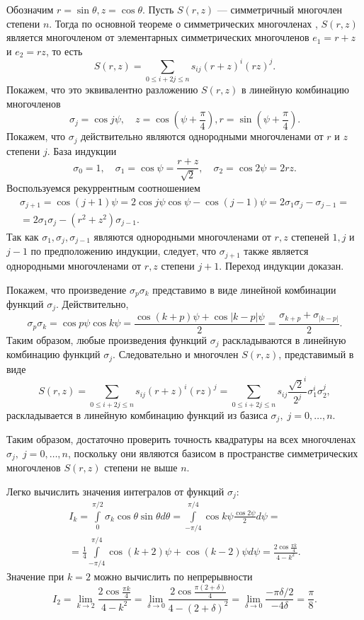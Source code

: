 Обозначим $r = \sin \theta, z = \cos \theta$. Пусть $S(r, z)$ --- симметричный многочлен степени $n$. Тогда по основной теореме о симметрических многочленах \cite{kurosh1968}, $S(r,z)$ является многочленом от элементарных симметрических многочленов $e_1 = r + z$ и $e_2 = r z$, то есть
\[
S(r, z) = \sum_{0 \leq i + 2j \leq n} s_{ij} (r + z)^i (r z)^{j}.
\]
Покажем, что это эквивалентно разложению $S(r, z)$ в линейную комбинацию многочленов
\[
\sigma_j = \cos j \psi, \quad z = \cos \left(\psi + \frac{\pi}{4}\right), r = \sin \left(\psi + \frac{\pi}{4}\right).
\]
Покажем, что $\sigma_j$ действительно являются однородными многочленами от $r$ и $z$ степени $j$. База индукции
\[
\sigma_0 = 1, \quad \sigma_1 = \cos \psi = \frac{r + z}{\sqrt{2}}, \quad \sigma_2 = \cos 2 \psi = 2 r z.
\]
Воспользуемся рекуррентным соотношением
\begin{multline*}
\sigma_{j+1} = \cos (j+1)\psi = 2\cos j\psi \cos \psi - \cos(j-1) \psi = 2 \sigma_1 \sigma_j - \sigma_{j-1} = \\ =
2 \sigma_1 \sigma_j - (r^2 + z^2) \sigma_{j-1}.
\end{multline*}
Так как $\sigma_1, \sigma_j, \sigma_{j-1}$ являются однородными многочленами от $r,z$ степеней $1, j$ и $j-1$ по предположению индукции, следует, что 
$\sigma_{j+1}$ также является однородными многочленами от $r,z$ степени $j + 1$. Переход индукции доказан.

Покажем, что произведение $\sigma_p \sigma_k$ представимо в виде линейной комбинации функций $\sigma_j$. Действительно,
\[
\sigma_p \sigma_k = \cos p \psi \cos k \psi = \frac{\cos (k + p) \psi + \cos |k - p|\psi}{2} = \frac{\sigma_{k+p} + \sigma_{|k-p|}}{2}.
\]
Таким образом, любые произведения функций $\sigma_j$ раскладываются в линейную комбинацию функций $\sigma_j$. Следовательно и многочлен $S(r, z)$, представимый в виде
\[
S(r, z) = \sum_{0 \leq i + 2j \leq n} s_{ij} (r + z)^i (r z)^{j} =  \sum_{0 \leq i + 2j \leq n} s_{ij} \frac{\sqrt{2}^i}{2^j} \sigma_1^i \sigma_2^{j},
\]
раскладывается в линейную комбинацию функций из базиса $\sigma_j, \; j = 0, \dots, n$.

Таким образом, достаточно проверить точность квадратуры на всех многочленах $\sigma_j, \; j = 0, \dots, n$, поскольку они являются базисом в пространстве симметрических многочленов $S(r, z)$ степени не выше $n$.

Легко вычислить значения интегралов от функций $\sigma_j$:
\begin{multline*}
I_k = \int\limits_0^{\pi/2} \sigma_k \cos \theta \sin \theta d\theta = 
\int\limits_{-\pi/4}^{\pi/4} \cos k \psi \frac{\cos 2 \psi}{2} d\psi = \\
= \frac{1}{4} \int\limits_{-\pi/4}^{\pi/4} \cos (k+2) \psi + \cos (k-2) \psi d\psi =
\frac{2\cos \frac{\pi k}{4}}{4 - k^2}.
\end{multline*}
Значение при $k = 2$ можно вычислить по непрерывности
\[
I_2 = \lim_{k \to 2} \frac{2\cos \frac{\pi k}{4}}{4 - k^2} = 
\lim_{\delta \to 0} \frac{2\cos \frac{\pi (2 + \delta)}{4}}{4 - (2 + \delta)^2} = 
\lim_{\delta \to 0} \frac{-\pi\delta/2}{-4\delta} = \frac{\pi}{8}.
\]

